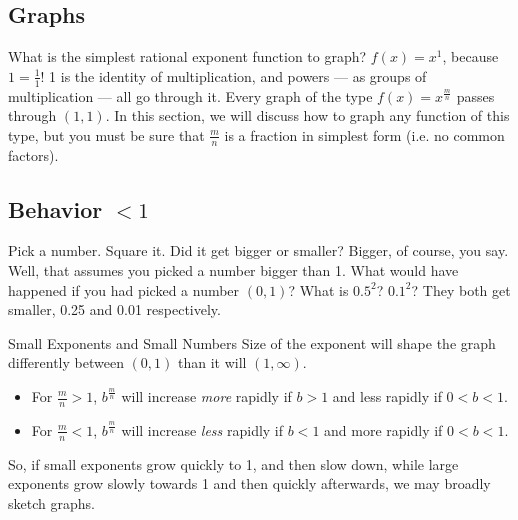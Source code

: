 
\subsection{Graphs}



What is the simplest rational exponent function to graph?  $f(x)=x^1$, because $1=\frac{1}{1}$!  
1 is the identity of multiplication, and powers --- as groups of multiplication --- all go through
it.  Every graph of the type $f(x)=x^{\frac{m}{n}}$ passes through $(1,1)$.  In this section, we will
discuss how to graph any function of this type, but you must be sure that $\frac{m}{n}$ is a fraction
in simplest form (i.e. no common factors).

\subsection{Behavior $<1$}
Pick a number.  Square it.  Did it get bigger or smaller?  Bigger, of course, you say.  Well, 
that assumes you picked a number bigger than 1.  What would have happened if you had
picked a number $(0,1)$?  What is $0.5^2$?  $0.1^2$?  They both get smaller, 0.25 and 0.01
respectively.  


\begin{derivation}{Small Exponents and Small Numbers}
Size of the exponent will shape the graph
differently between $(0,1)$ than it will $(1,\infty)$.
\begin{itemize}
\item For $\frac{m}{n}>1$, $b^\frac{m}{n}$ will increase \emph{more} rapidly if $b>1$ and less rapidly  if $0<b<1$.\\
\item For $\frac{m}{n}<1$, $b^\frac{m}{n}$ will increase \emph{less} rapidly if $b<1$ and more rapidly if $0<b<1$.
\end{itemize}
\end{derivation}


So, if small exponents grow quickly to 1, and then slow down, while large exponents grow
slowly towards 1 and then quickly afterwards, we may broadly sketch graphs.

